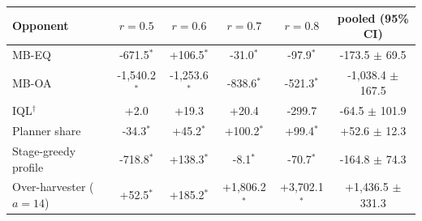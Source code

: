 \begin{tabular}{lccccc}
\toprule
Opponent & $r=0.5$ & $r=0.6$ & $r=0.7$ & $r=0.8$ & pooled (95\% CI) \\
\midrule
MB-EQ & -671.5$^{*}$ & +106.5$^{*}$ & -31.0$^{*}$ & -97.9$^{*}$ & -173.5 $\pm$ 69.5 \\
MB-OA & -1{,}540.2$^{*}$ & -1{,}253.6$^{*}$ & -838.6$^{*}$ & -521.3$^{*}$ & -1{,}038.4 $\pm$ 167.5 \\
IQL$^{\dagger}$ & +2.0 & +19.3 & +20.4 & -299.7 & -64.5 $\pm$ 101.9 \\
Planner share & -34.3$^{*}$ & +45.2$^{*}$ & +100.2$^{*}$ & +99.4$^{*}$ & +52.6 $\pm$ 12.3 \\
Stage-greedy profile & -718.8$^{*}$ & +138.3$^{*}$ & -8.1$^{*}$ & -70.7$^{*}$ & -164.8 $\pm$ 74.3 \\
Over-harvester ($a=14$) & +52.5$^{*}$ & +185.2$^{*}$ & +1{,}806.2$^{*}$ & +3{,}702.1$^{*}$ & +1{,}436.5 $\pm$ 331.3 \\
\bottomrule
\end{tabular}
